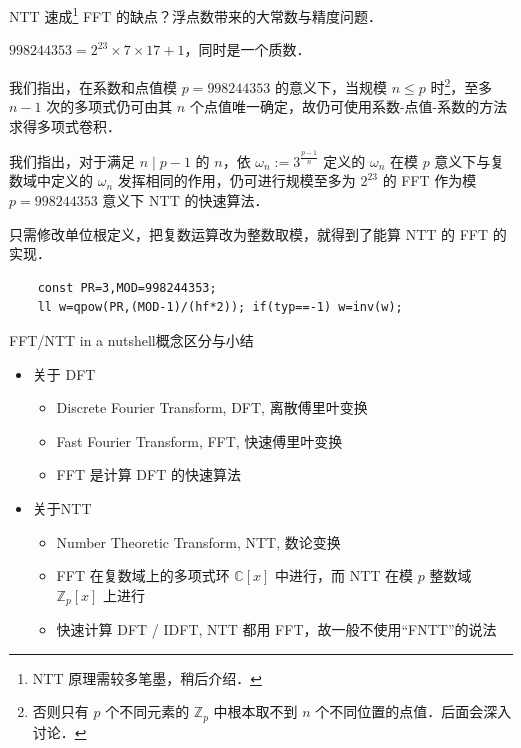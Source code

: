 \documentclass[fontset=fandol]{ctexbeamer}
\begin{document}
\begin{frame}[fragile]{NTT 速成\footnote{NTT 原理需较多笔墨，稍后介绍．}}
FFT 的缺点？浮点数带来的大常数与精度问题．

$998244353=2^{23} \times 7 \times 17 + 1$，同时是一个质数．

我们指出，在系数和点值模 $p=998244353$ 的意义下，当规模 $n \leq p$ 时\footnote{否则只有 $p$ 个不同元素的 $\mathbb Z_p$ 中根本取不到 $n$ 个不同位置的点值．后面会深入讨论．}，至多 $n-1$ 次的多项式仍可由其 $n$ 个点值唯一确定，故仍可使用系数-点值-系数的方法求得多项式卷积．

我们指出，对于满足 $n \mid p-1$ 的 $n$，依 $\omega_n := 3^{\frac{p-1}{n}}$ 定义的 $\omega_n$ 在模 $p$ 意义下与复数域中定义的 $\omega_n$ 发挥相同的作用，仍可进行规模至多为 $2^{23}$ 的 FFT 作为模 $p=998244353$ 意义下 NTT 的快速算法．

只需修改单位根定义，把复数运算改为整数取模，就得到了能算 NTT 的 FFT 的实现．

\begin{block}

\begin{verbatim}
    const PR=3,MOD=998244353;
    ll w=qpow(PR,(MOD-1)/(hf*2)); if(typ==-1) w=inv(w);
\end{verbatim}

\end{block}

\end{frame}

\begin{frame}{FFT/NTT in a nutshell}{概念区分与小结}
\begin{itemize}
    \item 关于 DFT
    \begin{itemize}
    \item Discrete Fourier Transform, DFT, 离散傅里叶变换
    \item Fast Fourier Transform, FFT, 快速傅里叶变换
    \item FFT 是计算 DFT 的快速算法
    \end{itemize}
    \item 关于NTT
    \begin{itemize}
    \item Number Theoretic Transform, NTT, 数论变换
    \item FFT 在复数域上的多项式环 $\mathbb{C}[x]$ 中进行，而 NTT 在模 $p$ 整数域 $\mathbb{Z}_p[x]$ 上进行
    \item 快速计算 DFT / IDFT, NTT 都用 FFT，故一般不使用“FNTT”的说法
    \end{itemize}
\end{itemize}
\end{frame}
\end{document}
